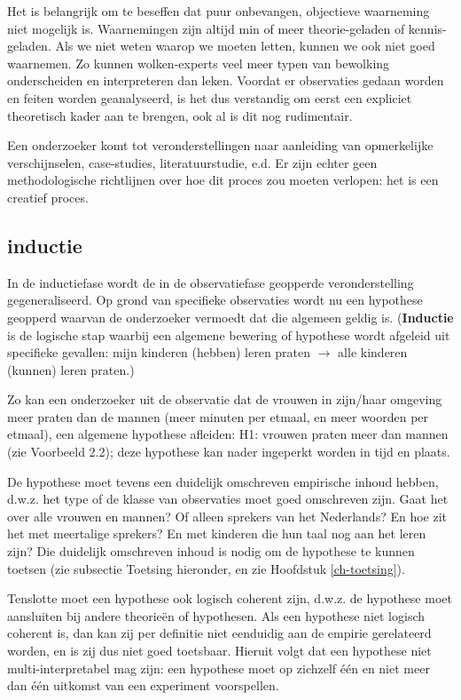\documentclass[
]{book}
\begin{document}
Het is belangrijk om te beseffen dat puur onbevangen, objectieve
waarneming niet mogelijk is. Waarnemingen zijn altijd min of meer
theorie-geladen of kennis-geladen. Als we niet weten waarop we moeten
letten, kunnen we ook niet goed waarnemen. Zo kunnen wolken-experts veel
meer typen van bewolking onderscheiden en interpreteren dan leken.
Voordat er observaties gedaan worden en feiten worden geanalyseerd, is
het dus verstandig om eerst een expliciet theoretisch kader aan te
brengen, ook al is dit nog rudimentair.

Een onderzoeker komt tot veronderstellingen naar aanleiding van
opmerkelijke verschijnselen, case-studies, literatuurstudie, e.d. Er
zijn echter geen methodologische richtlijnen over hoe dit proces zou
moeten verlopen: het is een creatief proces.

\subsection{inductie}\label{inductie}

In de inductiefase wordt de in de observatiefase geopperde
veronderstelling gegeneraliseerd. Op grond van specifieke observaties
wordt nu een hypothese geopperd waarvan de onderzoeker vermoedt dat die
algemeen geldig is. (\textbf{Inductie} is de logische stap waarbij een algemene
bewering of hypothese wordt afgeleid uit specifieke gevallen: mijn
kinderen (hebben) leren praten \(\rightarrow\) alle kinderen (kunnen)
leren praten.)

Zo kan een onderzoeker uit de observatie dat de vrouwen in zijn/haar
omgeving meer praten dan de mannen (meer minuten per etmaal, en meer
woorden per etmaal), een algemene hypothese afleiden: H1: vrouwen praten
meer dan mannen (zie Voorbeeld 2.2); deze hypothese kan nader ingeperkt
worden in tijd en plaats.

De hypothese moet tevens een duidelijk omschreven empirische inhoud
hebben, d.w.z. het type of de klasse van observaties moet goed
omschreven zijn. Gaat het over alle vrouwen en mannen? Of alleen
sprekers van het Nederlands? En hoe zit het met meertalige sprekers? En
met kinderen die hun taal nog aan het leren zijn? Die duidelijk
omschreven inhoud is nodig om de hypothese te kunnen toetsen (zie subsectie Toetsing hieronder, en zie Hoofdstuk \ref{ch-toetsing}).

Tenslotte moet een hypothese ook logisch coherent zijn, d.w.z. de
hypothese moet aansluiten bij andere theorieën of hypothesen. Als een
hypothese niet logisch coherent is, dan kan zij per definitie niet
eenduidig aan de empirie gerelateerd worden, en is zij dus niet goed
toetsbaar. Hieruit volgt dat een hypothese niet multi-interpretabel mag
zijn: een hypothese moet op zichzelf één en niet meer dan één uitkomst
van een experiment voorspellen.
\end{document}
